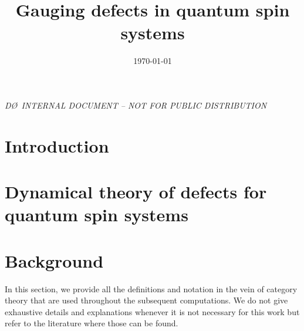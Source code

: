 



\widetext
{}
\centerline{\em D\O\ INTERNAL DOCUMENT -- NOT FOR PUBLIC DISTRIBUTION}


\title{Gauging defects in quantum spin systems}
\date{\today}


\begin{abstract}

\end{abstract}

\pacs{}
\maketitle

\section{Introduction}


\section{Dynamical theory of defects for quantum spin systems}



\section{Background}\label{S:defs}
In this section, we provide all the definitions and notation in the vein of category theory that are used throughout the subsequent computations. We do not give exhaustive details and explanations whenever it is not necessary for this work but refer to the literature where those can be found.


